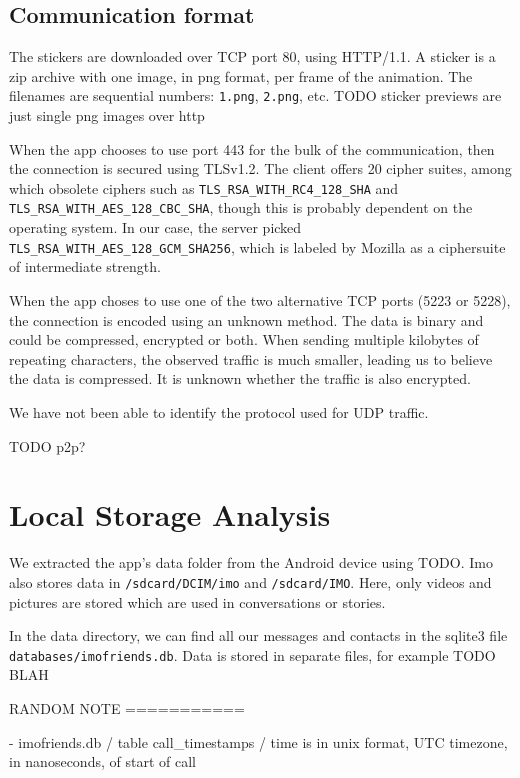 \documentclass[conference]{IEEEtran}
\begin{document}
\subsection{Communication format}

The stickers are downloaded over TCP port 80, using HTTP/1.1. A sticker is a
zip archive with one image, in png format, per frame of the animation. The
filenames are sequential numbers: \texttt{1.png}, \texttt{2.png}, etc. TODO
sticker previews are just single png images over http

When the app chooses to use port 443 for the bulk of the communication, then
the connection is secured using TLSv1.2. The client offers 20 cipher suites,
among which obsolete ciphers such as \texttt{TLS\_RSA\_WITH\_RC4\_128\_SHA} and
\texttt{TLS\_RSA\_WITH\_AES\_128\_CBC\_SHA}, though this is probably dependent
on the operating system. In our case, the server picked
\texttt{TLS\_RSA\_WITH\_AES\_128\_GCM\_SHA256}, which is labeled by Mozilla as
a ciphersuite of intermediate strength\cite{moz-tls}.

When the app choses to use one of the two alternative TCP ports (5223 or 5228),
the connection is encoded using an unknown method. The data is binary and could
be compressed, encrypted or both. When sending multiple kilobytes of repeating
characters, the observed traffic is much smaller, leading us to believe the
data is compressed. It is unknown whether the traffic is also encrypted.

We have not been able to identify the protocol used for UDP traffic.


TODO p2p?


\section{Local Storage Analysis}

We extracted the app's data folder from the Android device using TODO. Imo also
stores data in \texttt{/sdcard/DCIM/imo} and \texttt{/sdcard/IMO}. Here, only
videos and pictures are stored which are used in conversations or stories.

In the data directory, we can find all our messages and contacts in the sqlite3
file \texttt{databases/imofriends.db}. Data is stored in separate files, for
example TODO BLAH

RANDOM NOTE
===========

- imofriends.db / table call_timestamps / time is in unix format, UTC timezone, in nanoseconds, of start of call
\end{document}
